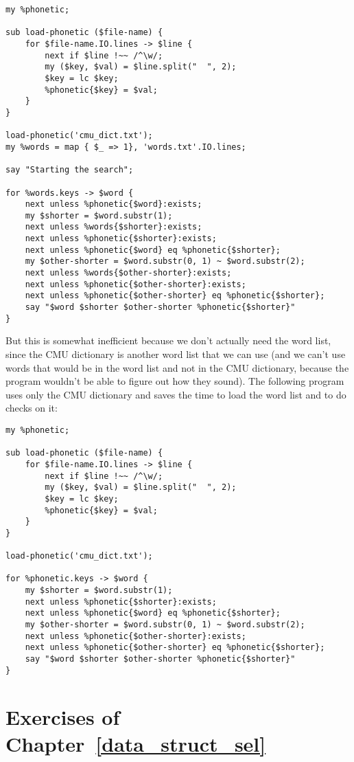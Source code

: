 \begin{verbatim}
my %phonetic;

sub load-phonetic ($file-name) {
    for $file-name.IO.lines -> $line {
        next if $line !~~ /^\w/; 
        my ($key, $val) = $line.split("  ", 2);
        $key = lc $key;
        %phonetic{$key} = $val;
    }
}

load-phonetic('cmu_dict.txt');
my %words = map { $_ => 1}, 'words.txt'.IO.lines;

say "Starting the search";

for %words.keys -> $word {
    next unless %phonetic{$word}:exists;
    my $shorter = $word.substr(1);
    next unless %words{$shorter}:exists;
    next unless %phonetic{$shorter}:exists;
    next unless %phonetic{$word} eq %phonetic{$shorter};
    my $other-shorter = $word.substr(0, 1) ~ $word.substr(2);
    next unless %words{$other-shorter}:exists;
    next unless %phonetic{$other-shorter}:exists;
    next unless %phonetic{$other-shorter} eq %phonetic{$shorter};
    say "$word $shorter $other-shorter %phonetic{$shorter}"
}
\end{verbatim}

But this is somewhat inefficient because we don't actually 
need the word list, since the CMU dictionary is another 
word list that we can use (and we can't use words 
that would be in the word list and not in the CMU dictionary, 
because the program wouldn't be able to figure out how 
they sound). The following program uses only the CMU 
dictionary and saves the time to load the word list and 
to do checks on it:

\begin{verbatim}
my %phonetic;

sub load-phonetic ($file-name) {
    for $file-name.IO.lines -> $line {
        next if $line !~~ /^\w/; 
        my ($key, $val) = $line.split("  ", 2);
        $key = lc $key;
        %phonetic{$key} = $val;
    }
}

load-phonetic('cmu_dict.txt');

for %phonetic.keys -> $word {
    my $shorter = $word.substr(1);
    next unless %phonetic{$shorter}:exists;
    next unless %phonetic{$word} eq %phonetic{$shorter};
    my $other-shorter = $word.substr(0, 1) ~ $word.substr(2);
    next unless %phonetic{$other-shorter}:exists;
    next unless %phonetic{$other-shorter} eq %phonetic{$shorter};
    say "$word $shorter $other-shorter %phonetic{$shorter}"
}
\end{verbatim}

\section{Exercises of Chapter~\ref{data_struct_sel}}

